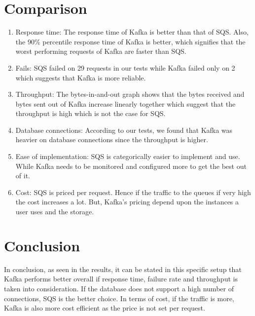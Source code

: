 \documentclass{IEEEtran}
\begin{document}
\section{Comparison}\label{sec:comparison}

\begin{enumerate}
    \item Response time:  The response time of Kafka is better than that of SQS. Also, the 90\% percentile response time of Kafka is better, which signifies that the worst performing requests of Kafka are faster than SQS.  
    \item Fails:  SQS failed on 29 requests  in our tests while Kafka failed only on 2 which suggests that Kafka is more reliable.
    \item Throughput:  The bytes-in-and-out graph shows that the bytes received and bytes sent out of Kafka increase linearly together which suggest that the throughput is high which is not the case for SQS. 
    \item Database connections:  According to our tests, we found that Kafka was heavier on database connections since the throughput is higher.
    \item Ease of implementation: SQS is categorically easier to implement and use. While Kafka needs to be monitored and configured more to get the best out of it. 
    \item Cost: SQS is priced per request. Hence if the traffic to the queues if very high the cost increases a lot. But, Kafka's pricing depend upon the instances a user uses and the storage. 
    
\end{enumerate}

\section{Conclusion}\label{sec:conclusions}
In conclusion, as seen in the results, it can be stated in this specific setup that Kafka performs better overall if response time, failure rate and throughput is taken into consideration. If the database does not support a high number of connections, SQS is the better choice. In terms of cost, if the traffic is more, Kafka is also more cost efficient as the price is not set per request.
\end{document}
